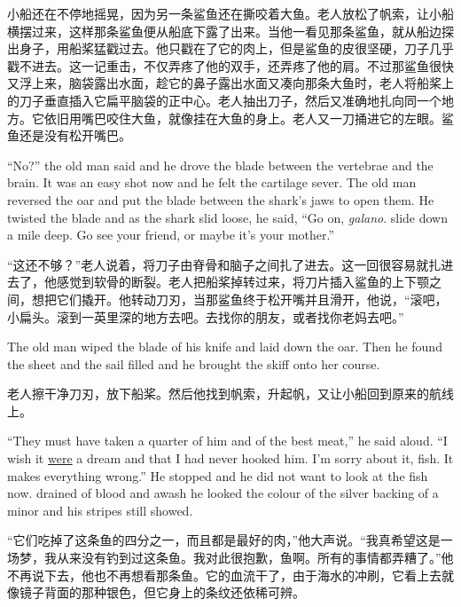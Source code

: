 \begin{paracol}{2}
\switchcolumn

小船还在不停地摇晃，因为另一条鲨鱼还在撕咬着大鱼。老人放松了帆索，让小船横摆过来，这样那条鲨鱼便从船底下露了出来。当他一看见那条鲨鱼，就从船边探出身子，用船桨猛戳过去。他只戳在了它的肉上，但是鲨鱼的皮很坚硬，刀子几乎戳不进去。这一记重击，不仅弄疼了他的双手，还弄疼了他的肩。不过那鲨鱼很快又浮上来，脑袋露出水面，趁它的鼻子露出水面又凑向那条大鱼时，老人将船桨上的刀子垂直插入它扁平脑袋的正中心。老人抽出刀子，然后又准确地扎向同一个地方。它依旧用嘴巴咬住大鱼，就像挂在大鱼的身上。老人又一刀捅进它的左眼。鲨鱼还是没有松开嘴巴。

\switchcolumn*

``No?'' the old man said and he drove the blade between the \gls{vertebrae}
and the brain. It was an easy shot now and he felt the \gls{cartilage}
\gls{sever}. The old man \gls{reversed} the oar and put the blade between the
shark's jaws to open them. He \gls{twisted} the blade and as the shark slid
loose, he said, ``Go on, \emph{galano}. \Gls{slide} down a mile deep. Go see your friend,
or maybe it's your mother.''

\switchcolumn

“这还不够？”老人说着，将刀子由脊骨和脑子之间扎了进去。这一回很容易就扎进去了，他感觉到软骨的断裂。老人把船桨掉转过来，将刀片插入鲨鱼的上下颚之间，想把它们撬开。他转动刀刃，当那鲨鱼终于松开嘴并且滑开，他说，“滚吧，小扁头。滚到一英里深的地方去吧。去找你的朋友，或者找你老妈去吧。”

\switchcolumn*

The old man wiped the blade of his knife and laid down the oar. Then he
found the sheet and the sail filled and he brought the skiff onto her
course.

\switchcolumn

老人擦干净刀刃，放下船桨。然后他找到帆索，升起帆，又让小船回到原来的航线上。

\switchcolumn*

``They must have taken a quarter of him and of the best meat,'' he said
aloud. ``I wish it \uline{were} a dream and that I had never hooked him.
I'm sorry about it, fish. It makes everything wrong.'' He stopped and he did
not want to look at the fish now. \Gls{drained} of blood and \gls{awash} he
looked the colour of the silver backing of a minor and his stripes still
showed.

\switchcolumn

“它们吃掉了这条鱼的四分之一，而且都是最好的肉，”他大声说。“我真希望这是一场梦，我从来没有钓到过这条鱼。我对此很抱歉，鱼啊。所有的事情都弄糟了。”他不再说下去，他也不再想看那条鱼。它的血流干了，由于海水的冲刷，它看上去就像镜子背面的那种银色，但它身上的条纹还依稀可辨。


\end{paracol}

